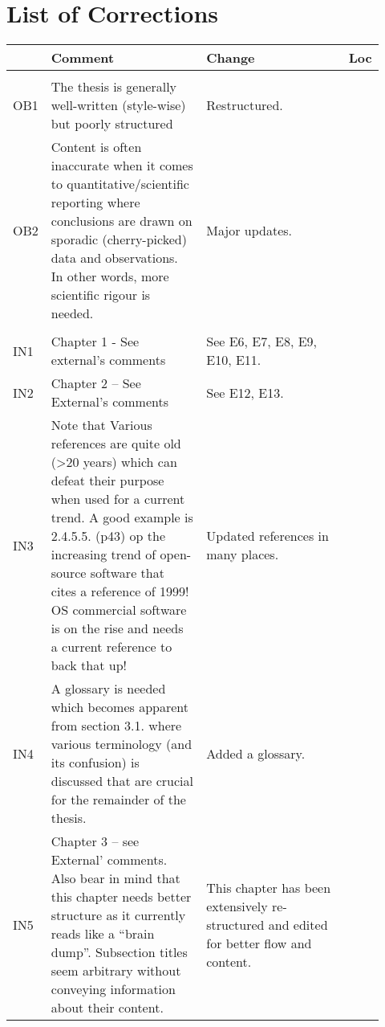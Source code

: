 \renewcommand\chaptername{Submission Notes} %
\chapter*{List of Corrections}

\newcommand{\p}[1]{\pageref{#1}}

\begin{longtable}{>{\raggedright} p{0.06\linewidth} | >{\raggedright} p{0.42\linewidth} | >{\raggedright} p{0.39\linewidth} | p{0.045\linewidth}}
    & \textbf{Comment} & \textbf{Change} & \textbf{Loc} \\
    \hline
    \multicolumn{4}{c}{Observations} \\
    \hline
    OB1 & The thesis is generally well-written (style-wise) but poorly structured
    & Restructured. & \\

    OB2 & Content is often inaccurate when it comes to quantitative/scientific reporting where conclusions are drawn on sporadic (cherry-picked) data and observations. In other words, more scientific rigour is needed.
    & Major updates. & \\

    \hline
    \multicolumn{4}{c}{Internal Examiner Comments} \\
    \hline

    IN1 & Chapter 1 - See external's comments
    & See E6, E7, E8, E9, E10, E11. & \\

    IN2 & Chapter 2 – See External’s comments
    & See E12, E13. & \\

    IN3 & Note that Various references are quite old (>20 years) which can defeat their purpose when used for a current trend. A good example is 2.4.5.5. (p43) op the increasing trend of open-source software that cites a reference of 1999! OS commercial software is on the rise and needs a current reference to back that up!
    & Updated references in many places. & \p{IN3} \\

    IN4 & A glossary is needed which becomes apparent from section 3.1. where various terminology (and its confusion) is discussed that are crucial for the remainder of the thesis.
    & Added a glossary. & \p{glossary} \\

    IN5 & Chapter 3 – see External’ comments. Also bear in mind that this chapter needs better structure as it currently reads like a “brain dump”. Subsection titles seem arbitrary without conveying information about their content.
    & This chapter has been extensively re-structured and edited for better flow and content. & \p{chapter:context} \\


\end{longtable}

